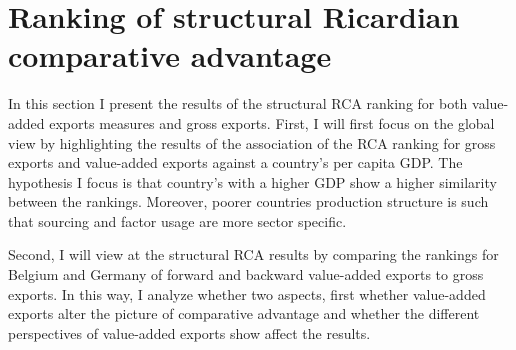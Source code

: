 \section{Ranking of structural Ricardian comparative advantage }
In this section I present the results of the structural RCA ranking for both value-added exports measures and gross exports. First, I will first focus on the global view by highlighting the results of the association of the RCA ranking for gross exports and value-added exports against a country's per capita GDP. The hypothesis I focus is that country's with a higher GDP show a higher similarity between the rankings. Moreover, poorer countries production structure is such that sourcing and factor usage are more sector specific. \par Second, I will view at the structural RCA results by comparing the rankings for Belgium and Germany of forward and backward value-added exports to gross exports. In this way, I analyze whether two aspects, first whether value-added exports alter the picture of comparative advantage and whether the different perspectives of value-added exports show affect the results. 
